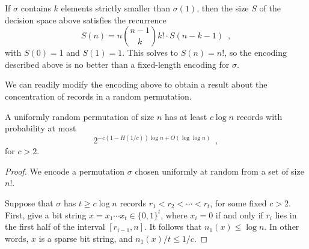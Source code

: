 \documentclass{patmorin}
\begin{document}
If $\sigma$ contains $k$ elements strictly smaller than $\sigma(1)$,
then the size $S$ of the decision space above satisfies the recurrence
\[
S(n) = n \binom{n - 1}{k} k! \cdot S(n - k - 1) \enspace ,
\]
with $S(0) = 1$ and $S(1) = 1$. This solves to $S(n) = n!$, so the
encoding described above is no better than a fixed-length encoding for
$\sigma$.

We can readily modify the encoding above to obtain a result about the
concentration of records in a random permutation.

\begin{thm}
  A uniformly random permutation of size $n$ has at least $c \log n$
  records with probability at most
  \[
  2^{-c (1 - H(1/c)) \log n + O(\log \log n)} \enspace ,
  \]
  for $c > 2$.
\end{thm}
\begin{proof}
  We encode a permutation $\sigma$ chosen uniformly at random from a
  set of size $n!$.

  Suppose that $\sigma$ has $t \geq c\log n$ records $r_1 < r_2 <
  \cdots < r_t$, for some fixed $c > 2$. First, give a bit string $x =
  x_1 \cdots x_t \in \{0, 1\}^t$, where $x_i = 0$ if and only if $r_i$
  lies in the first half of the interval $[r_{i - 1}, n]$. It follows
  that $n_1(x) \leq \log n$. In other words, $x$ is a sparse bit string, and $n_1(x)/t \leq 1/c$.


\end{proof}
\end{document}
